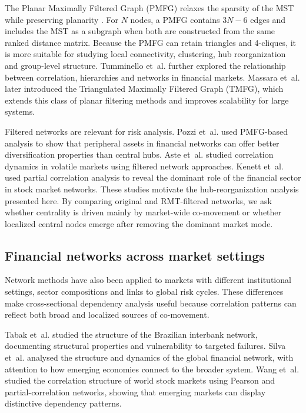 The Planar Maximally Filtered Graph (PMFG) relaxes the sparsity of the MST while preserving planarity \cite{tumminello_2005_tool}. For $N$ nodes, a PMFG contains $3N-6$ edges and includes the MST as a subgraph when both are constructed from the same ranked distance matrix. Because the PMFG can retain triangles and 4-cliques, it is more suitable for studying local connectivity, clustering, hub reorganization and group-level structure. Tumminello et~al. \cite{tumminello_2010_correlation} further explored the relationship between correlation, hierarchies and networks in financial markets. Massara et~al. \cite{massara_2016_tmfg} later introduced the Triangulated Maximally Filtered Graph (TMFG), which extends this class of planar filtering methods and improves scalability for large systems.

Filtered networks are relevant for risk analysis. Pozzi et~al. \cite{pozzi_2013_spread} used PMFG-based analysis to show that peripheral assets in financial networks can offer better diversification properties than central hubs. Aste et~al. \cite{aste_2010_correlation} studied correlation dynamics in volatile markets using filtered network approaches. Kenett et~al. \cite{kenett_2012_dominating} used partial correlation analysis to reveal the dominant role of the financial sector in stock market networks. These studies motivate the hub-reorganization analysis presented here. By comparing original and RMT-filtered networks, we ask whether centrality is driven mainly by market-wide co-movement or whether localized central nodes emerge after removing the dominant market mode.

\subsection{Financial networks across market settings}

Network methods have also been applied to markets with different institutional settings, sector compositions and links to global risk cycles. These differences make cross-sectional dependency analysis useful because correlation patterns can reflect both broad and localized sources of co-movement.

Tabak et~al. \cite{tabak_2010_topology} studied the structure of the Brazilian interbank network, documenting structural properties and vulnerability to targeted failures. Silva et~al. \cite{silva_2016_structure} analysed the structure and dynamics of the global financial network, with attention to how emerging economies connect to the broader system. Wang et~al. \cite{wang_2018_correlation} studied the correlation structure of world stock markets using Pearson and partial-correlation networks, showing that emerging markets can display distinctive dependency patterns.

